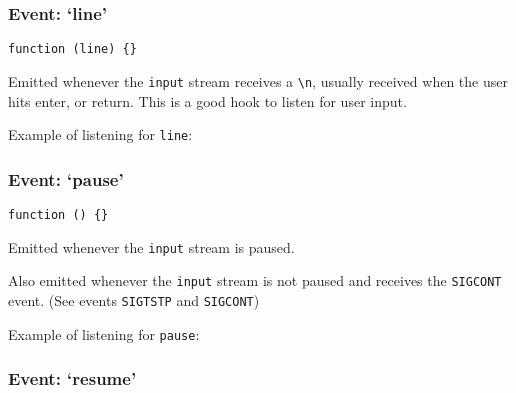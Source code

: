 \subsubsection{\texorpdfstring{Event:
`line'}{Event: line}}\label{event-line}

\texttt{function\ (line)\ \{\}}

Emitted whenever the \texttt{input} stream receives a
\texttt{\textbackslash{}n}, usually received when the user hits enter,
or return. This is a good hook to listen for user input.

Example of listening for \texttt{line}:

\begin{Shaded}
\begin{Highlighting}[]
\NormalTok{(}\NormalTok{, } 
  \NormalTok{(}
\NormalTok{\});}
\end{Highlighting}
\end{Shaded}

\subsubsection{\texorpdfstring{Event:
`pause'}{Event: pause}}\label{event-pause}

\texttt{function\ ()\ \{\}}

Emitted whenever the \texttt{input} stream is paused.

Also emitted whenever the \texttt{input} stream is not paused and
receives the \texttt{SIGCONT} event. (See events \texttt{SIGTSTP} and
\texttt{SIGCONT})

Example of listening for \texttt{pause}:

\begin{Shaded}
\begin{Highlighting}[]
\NormalTok{(}\NormalTok{, }\NormalTok{() \{}
  \NormalTok{(}\NormalTok{);}
\NormalTok{\});}
\end{Highlighting}
\end{Shaded}

\subsubsection{\texorpdfstring{Event:
`resume'}{Event: resume}}\label{event-resume}

